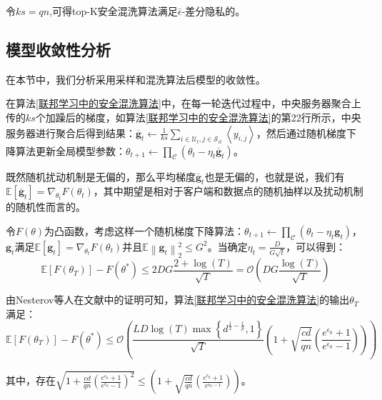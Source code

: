 令$ks = qn$,可得top-K安全混洗算法满足$\bar{\epsilon}$-差分隐私的。

\subsection{模型收敛性分析}
在本节中，我们分析采用采样和混洗算法后模型的收敛性。

在算法\ref{联邦学习中的安全混洗算法}中，在每一轮迭代过程中，中央服务器聚合上传的$ks$个加躁后的梯度，如算法\ref{联邦学习中的安全混洗算法}的第22行所示，中央服务器进行聚合后得到结果：$\overline{\mathbf{g}}_{t} \leftarrow \frac{1}{k s} \sum_{i \in \mathcal{U}_{t}, j \in \mathcal{S}_{i t}} \left\langle y_{i,j} \right\rangle$，然后通过随机梯度下降算法更新全局模型参数：$\theta_{t+1} \leftarrow \prod_{\mathcal{C}}\left(\theta_{t}-\eta_{t} \overline{\mathbf{g}}_{t}\right)$。

既然随机扰动机制是无偏的，那么平均梯度$\overline{\mathbf{g}}_{t}$也是无偏的，也就是说，我们有 $\mathbb{E}\left[\overline{\mathbf{g}}_{t}\right]=\nabla_{\theta_{t}} F\left(\theta_{t}\right)$，其中期望是相对于客户端和数据点的随机抽样以及扰动机制的随机性而言的。

令$F(\theta)$为凸函数，考虑这样一个随机梯度下降算法：$\theta_{t+1} \leftarrow \prod_{\mathcal{C}}\left(\theta_{t}-\eta_{t} \mathbf{g}_{t}\right)$，$\mathbf{g}_{t}$满足$\mathbb{E}\left[\mathbf{g}_{t}\right]=\nabla_{\theta_{t}} F\left(\theta_{t}\right)$并且$\mathbb{E}\left\|\mathbf{g}_{t}\right\|_{2}^{2} \leq G^{2}$。当确定$\eta_{t}=\frac{D}{G \sqrt{t}}$，可以得到：
\begin{equation}\label{eq：模型收敛性证明1}
\mathbb{E}\left[F\left(\theta_{T}\right)\right]-F\left(\theta^{*}\right) \leq 2 D G \frac{2+\log (T)}{\sqrt{T}}=\mathcal{O}\left(D G \frac{\log (T)}{\sqrt{T}}\right)
\end{equation} 

由Nesterov等人在文献中的证明可知，算法\ref{联邦学习中的安全混洗算法}的输出$\theta_{T}$满足：
\begin{equation}\label{eq:模型收敛性证明2}
\mathbb{E}\left[F\left(\theta_{T}\right)\right]-F\left(\theta^{*}\right) \leq \mathcal{O}\left(\frac{L D \log (T) \max \left\{d^{\frac{1}{2}-\frac{1}{p}}, 1\right\}}{\sqrt{T}}\left(1+\sqrt{\frac{c d}{q n}}\left(\frac{e^{\epsilon_{0}}+1}{e^{\epsilon_{0}}-1}\right)\right)\right)
\end{equation}

其中，存在$\sqrt{1+\frac{c d}{q n}\left(\frac{e^{\epsilon_{0}}+1}{e^{\epsilon_{0}}-1}\right)^{2}} \leq\left(1+\sqrt{\frac{c d}{q n}}\left(\frac{e^{\epsilon_{0}}+1}{e^{\epsilon_{0}-1}}\right)\right)$。

